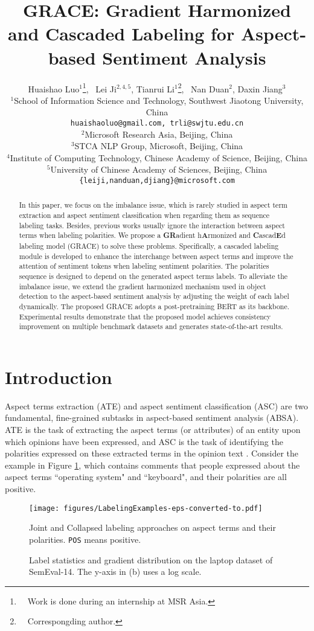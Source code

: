 \documentclass[11pt,a4paper]{article}
\title{GRACE: Gradient Harmonized and Cascaded Labeling for Aspect-based Sentiment Analysis}
\author{Huaishao Luo$^1$\thanks{~~Work is done during an internship at MSR Asia.}, ~Lei Ji$^{2,4,5}$, Tianrui Li$^1$\thanks{~~Correspongding author.}, ~Nan Duan$^{2}$, Daxin Jiang$^{3}$\\
    $^1$School of Information Science and Technology, Southwest Jiaotong University, China\\
    {\tt huaishaoluo@gmail.com, trli@swjtu.edu.cn}\\
	$^2$Microsoft Research Asia, Beijing, China\\
	$^3$STCA NLP Group, Microsoft, Beijing, China \\
	$^4$Institute of Computing Technology, Chinese Academy of Science, Beijing, China\\
	$^5$University of Chinese Academy of Sciences, Beijing, China \\
	{\tt \{leiji,nanduan,djiang\}@microsoft.com}
}
\date{}
\begin{document}
\maketitle
\begin{abstract}
In this paper, we focus on the imbalance issue, which is rarely studied in aspect term extraction and aspect sentiment classification when regarding them as sequence labeling tasks. Besides, previous works usually ignore the interaction between aspect terms when labeling polarities. We propose a \textbf{GR}adient h\textbf{A}rmonized and \textbf{C}ascad\textbf{E}d labeling model (GRACE) to solve these problems. Specifically, a cascaded labeling module is developed to enhance the interchange between aspect terms and improve the attention of sentiment tokens when labeling sentiment polarities. The polarities sequence is designed to depend on the generated aspect terms labels. To alleviate the imbalance issue, we extend the gradient harmonized mechanism used in object detection to the aspect-based sentiment analysis by adjusting the weight of each label dynamically. The proposed GRACE adopts a post-pretraining BERT as its backbone. Experimental results demonstrate that the proposed model achieves consistency improvement on multiple benchmark datasets and generates state-of-the-art results.
\end{abstract}

\section{Introduction}
\label{sec_introduction}
Aspect terms extraction (ATE) and aspect sentiment classification (ASC) are two fundamental, fine-grained subtasks in aspect-based sentiment analysis (ABSA). ATE is the task of extracting the aspect terms (or attributes) of an entity upon which opinions have been expressed, and ASC is the task of identifying the polarities expressed on these extracted terms in the opinion text \cite{Hu2004}. Consider the example in Figure \ref{table_labeling_examples}, which contains comments that people expressed about the aspect terms ``operating system" and ``keyboard", and their polarities are all positive.
\begin{figure}[htb]
	\centering
	\texttt{[image: figures/LabelingExamples-eps-converted-to.pdf]}
    \caption{Joint and Collapsed labeling approaches on aspect terms and their polarities. \texttt{POS} means positive.}
    \label{table_labeling_examples}
\end{figure}
\begin{figure}[htb]
    \centering
    \caption{Label statistics and gradient distribution on the laptop dataset of SemEval-14. The y-axis in (b) uses a log scale.}  
    \label{fig_statistic}
\end{figure}
\end{document}
